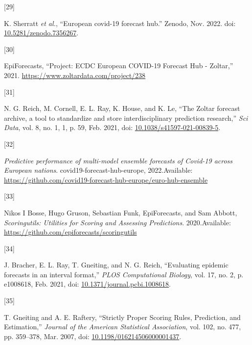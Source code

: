\documentclass[
]{article}
\newlength{\cslhangindent}
\newlength{\csllabelwidth}
\newlength{\cslentryspacingunit} %
\newenvironment{CSLReferences}[2] %
 {%
  \setlength{\parindent}{0pt}
  \ifodd #1
  \let\oldpar\par
  \def\par{\hangindent=\cslhangindent\oldpar}
  \fi
  \setlength{\parskip}{#2\cslentryspacingunit}
 }%
 {}
\newcommand{\CSLLeftMargin}[1]{\parbox[t]{\csllabelwidth}{#1}}
\newcommand{\CSLRightInline}[1]{\parbox[t]{\linewidth - \csllabelwidth}{#1}\break}
\begin{document}
\begin{CSLReferences}{0}{0}
\leavevmode{}%
\CSLLeftMargin{{[}29{]} }
\CSLRightInline{K. Sherratt \emph{et al.}, {``European covid-19 forecast hub.''} Zenodo, Nov. 2022. doi: \href{https://doi.org/10.5281/zenodo.7356267}{10.5281/zenodo.7356267}.}

\leavevmode{}%
\CSLLeftMargin{{[}30{]} }
\CSLRightInline{EpiForecasts, {``Project: {ECDC European COVID-19 Forecast Hub} - {Zoltar},''} 2021. \url{https://www.zoltardata.com/project/238}}

\leavevmode{}%
\CSLLeftMargin{{[}31{]} }
\CSLRightInline{N. G. Reich, M. Cornell, E. L. Ray, K. House, and K. Le, {``The {Zoltar} forecast archive, a tool to standardize and store interdisciplinary prediction research,''} \emph{Sci Data}, vol. 8, no. 1, 1, p. 59, Feb. 2021, doi: \href{https://doi.org/10.1038/s41597-021-00839-5}{10.1038/s41597-021-00839-5}.}

\leavevmode{}%
\CSLLeftMargin{{[}32{]} }
\CSLRightInline{\emph{Predictive performance of multi-model ensemble forecasts of {Covid-19} across {European} nations}. {covid19-forecast-hub-europe}, 2022.Available: \url{https://github.com/covid19-forecast-hub-europe/euro-hub-ensemble}}

\leavevmode{}%
\CSLLeftMargin{{[}33{]} }
\CSLRightInline{Nikos I Bosse, Hugo Gruson, Sebastian Funk, EpiForecasts, and Sam Abbott, \emph{Scoringutils: {Utilities} for {Scoring} and {Assessing Predictions}}. 2020.Available: \url{https://github.com/epiforecasts/scoringutils}}

\leavevmode{}%
\CSLLeftMargin{{[}34{]} }
\CSLRightInline{J. Bracher, E. L. Ray, T. Gneiting, and N. G. Reich, {``Evaluating epidemic forecasts in an interval format,''} \emph{PLOS Computational Biology}, vol. 17, no. 2, p. e1008618, Feb. 2021, doi: \href{https://doi.org/10.1371/journal.pcbi.1008618}{10.1371/journal.pcbi.1008618}.}

\leavevmode{}%
\CSLLeftMargin{{[}35{]} }
\CSLRightInline{T. Gneiting and A. E. Raftery, {``Strictly {Proper Scoring Rules}, {Prediction}, and {Estimation},''} \emph{Journal of the American Statistical Association}, vol. 102, no. 477, pp. 359--378, Mar. 2007, doi: \href{https://doi.org/10.1198/016214506000001437}{10.1198/016214506000001437}.}


\end{CSLReferences}
\end{document}
